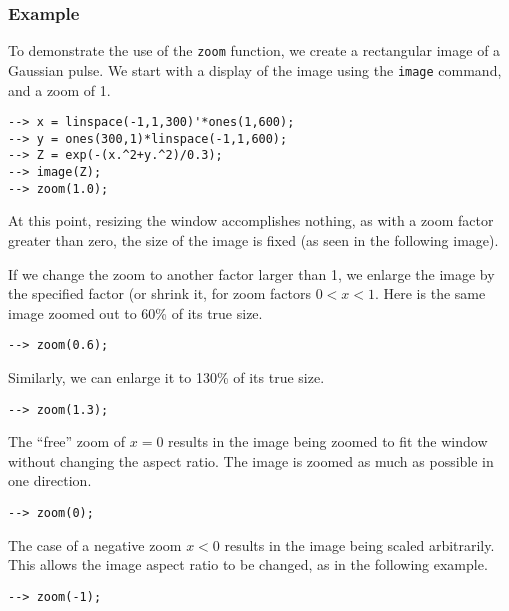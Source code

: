 \subsubsection{Example}
To demonstrate the use of the \verb|zoom| function, we create a rectangular image 
of a Gaussian pulse.  We start with a display of the image using the \verb|image|
command, and a zoom of 1.
\begin{verbatim}
--> x = linspace(-1,1,300)'*ones(1,600);
--> y = ones(300,1)*linspace(-1,1,600);
--> Z = exp(-(x.^2+y.^2)/0.3);
--> image(Z);
--> zoom(1.0);
\end{verbatim}


At this point, resizing the window accomplishes nothing, as with a zoom factor 
greater than zero, the size of the image is fixed (as seen in the following image).


If we change the zoom to another factor larger than 1, we enlarge the image by
the specified factor (or shrink it, for zoom factors $0 < x < 1$.  Here is the
same image zoomed out to 60\% of its true size.
\begin{verbatim}
--> zoom(0.6);
\end{verbatim}


Similarly, we can enlarge it to 130\% of its true size.
\begin{verbatim}
--> zoom(1.3);
\end{verbatim}


The ``free'' zoom of $x = 0$ results in the image being zoomed to fit the window
without changing the aspect ratio.  The image is zoomed as much as possible in
one direction.
\begin{verbatim}
--> zoom(0);
\end{verbatim}


The case of a negative zoom $x < 0$ results in the image being scaled arbitrarily.
This allows the image aspect ratio to be changed, as in the following example.
\begin{verbatim}
--> zoom(-1);
\end{verbatim}

